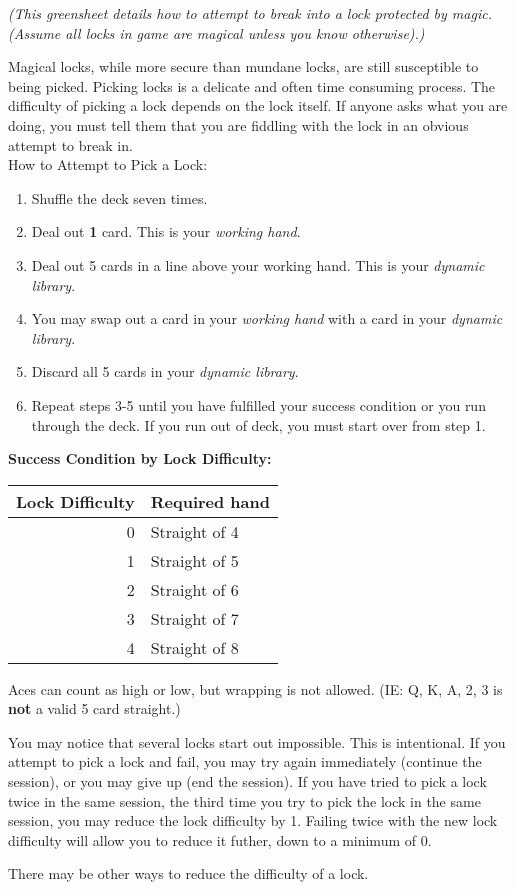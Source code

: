 \documentclass[green]{NeptuneBall}
\begin{document}
\name{\gDecking{}}

\emph{(This greensheet details how to attempt to break into a lock protected by magic. (Assume all locks in game are magical unless you know otherwise).)}

Magical locks, while more secure than mundane locks, are still susceptible to being picked. Picking locks is a delicate and often time consuming process. The difficulty of picking a lock depends on the lock itself. If anyone asks what you are doing, you must tell them that you are fiddling with the lock in an obvious attempt to break in.\\

How to Attempt to Pick a Lock:
\begin{enumerate}
	\item Shuffle the deck seven times.
	\item Deal out {\bf 1} card. This is your {\em working hand}.
	\item Deal out 5 cards in a line above your working hand. This is your {\em dynamic library}.
	\item You may swap out a card in your {\em working hand} with a card in your {\em dynamic library}.
	\item Discard all 5 cards in your {\em dynamic library}.
	\item Repeat steps 3-5 until you have fulfilled your success condition or you run through the deck.  If you run out of deck, you must start over from step 1.
\end{enumerate}

{\bf Success Condition by Lock Difficulty:}\\
\begin{tabular}{||r|l||}
\hline\hline
Lock Difficulty	& Required hand\\
\hline
0	& Straight of 4\\
1	& Straight of 5\\
2	& Straight of 6\\
3	& Straight of 7\\
4	& Straight of 8\\
\hline\hline 
\end{tabular}

\vspace{10 mm}

Aces can count as high or low, but wrapping is not allowed. (IE: Q, K, A, 2, 3 is {\bf not} a valid 5 card straight.)

You may notice that several locks start out impossible. This is intentional. If you attempt to pick a lock and fail, you may try again immediately (continue the session), or you may give up (end the session). If you have tried to pick a lock twice in the same session, the third time you try to pick the lock in the same session, you may reduce the lock difficulty by 1. Failing twice with the new lock difficulty will allow you to reduce it futher, down to a minimum of 0.

There may be other ways to reduce the difficulty of a lock.
\end{document}
